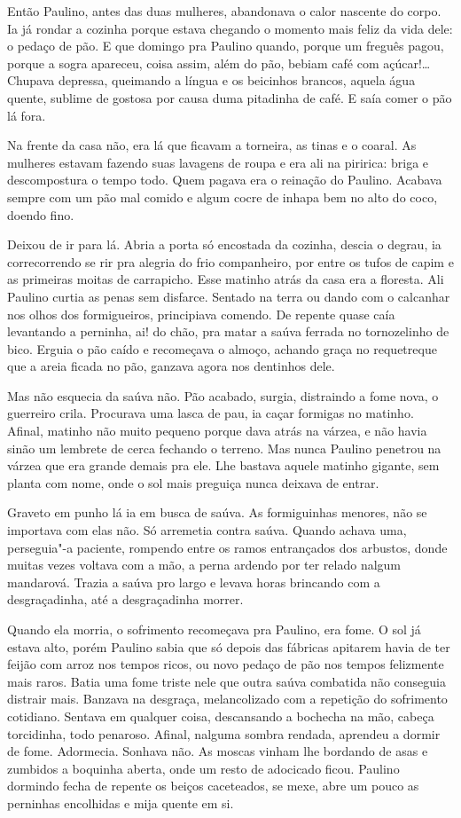 Então Paulino, antes das duas mulheres, abandonava o calor nascente do
corpo. Ia já rondar a cozinha porque estava chegando o momento mais
feliz da vida dele: o pedaço de pão. E que domingo pra Paulino quando,
porque um freguês pagou, porque a sogra apareceu, coisa assim, além do
pão, bebiam café com açúcar!\ldots{} Chupava depressa, queimando a língua e
os beicinhos brancos, aquela água quente, sublime de gostosa por causa
duma pitadinha de café. E saía comer o pão lá fora.

Na frente da casa não, era lá que ficavam a torneira, as tinas e o
coaral. As mulheres estavam fazendo suas lavagens de roupa e era ali na
piririca: briga e descompostura o tempo todo. Quem pagava era o reinação
do Paulino. Acabava sempre com um pão mal comido e algum cocre de inhapa
bem no alto do coco, doendo fino.

Deixou de ir para lá. Abria a porta só encostada da cozinha, descia o
degrau, ia correcorrendo se rir pra alegria do frio companheiro, por
entre os tufos de capim e as primeiras moitas de carrapicho. Esse
matinho atrás da casa era a floresta. Ali Paulino curtia as penas sem
disfarce. Sentado na terra ou dando com o calcanhar nos olhos dos
formigueiros, principiava comendo. De repente quase caía levantando a
perninha, ai! do chão, pra matar a saúva ferrada no tornozelinho de
bico. Erguia o pão caído e recomeçava o almoço, achando graça no
requetreque que a areia ficada no pão, ganzava agora nos dentinhos dele.

Mas não esquecia da saúva não. Pão acabado, surgia, distraindo a fome
nova, o guerreiro crila. Procurava uma lasca de pau, ia caçar formigas
no matinho. Afinal, matinho não muito pequeno porque dava atrás na
várzea, e não havia sinão um lembrete de cerca fechando o terreno. Mas
nunca Paulino penetrou na várzea que era grande demais pra ele. Lhe
bastava aquele matinho gigante, sem planta com nome, onde o sol mais
preguiça nunca deixava de entrar.

Graveto em punho lá ia em busca de saúva. As formiguinhas menores, não
se importava com elas não. Só arremetia contra saúva. Quando achava uma,
perseguia"-a paciente, rompendo entre os ramos entrançados dos arbustos,
donde muitas vezes voltava com a mão, a perna ardendo por ter relado
nalgum mandarová. Trazia a saúva pro largo e levava horas brincando com
a desgraçadinha, até a desgraçadinha morrer.

Quando ela morria, o sofrimento recomeçava pra Paulino, era fome. O sol
já estava alto, porém Paulino sabia que só depois das fábricas apitarem
havia de ter feijão com arroz nos tempos ricos, ou novo pedaço de pão
nos tempos felizmente mais raros. Batia uma fome triste nele que outra
saúva combatida não conseguia distrair mais. Banzava na desgraça,
melancolizado com a repetição do sofrimento cotidiano. Sentava em
qualquer coisa, descansando a bochecha na mão, cabeça torcidinha, todo
penaroso. Afinal, nalguma sombra rendada, aprendeu a dormir de fome.
Adormecia. Sonhava não. As moscas vinham lhe bordando de asas e zumbidos
a boquinha aberta, onde um resto de adocicado ficou. Paulino dormindo
fecha de repente os beiços caceteados, se mexe, abre um pouco as
perninhas encolhidas e mija quente em si.

